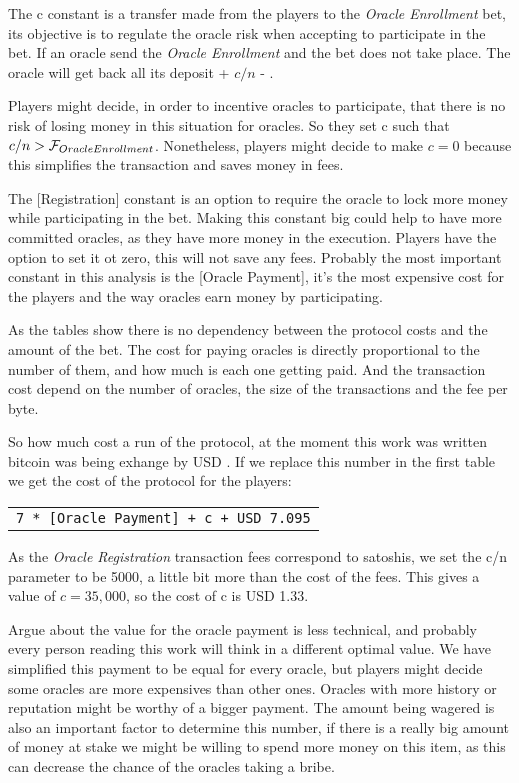 The c constant is a transfer made from the players to the
  \textit{Oracle Enrollment} bet, its objective is to regulate the oracle
  risk when accepting to participate in the bet.
If an oracle send the \textit{Oracle Enrollment} and the bet does not take
  place. The oracle will get back all its deposit + $c/n$ -
  .

Players might decide, in order to incentive oracles to participate, that there
  is no risk of losing money in this situation for oracles. So they set c such
  that $c/n > \mathcal{F}_{OracleEnrollment}$.
Nonetheless, players might decide to make $c = 0$ because this simplifies the
  transaction and saves money in fees.

The [Registration] constant is an option to require the oracle to lock more
  money while participating in the bet.
Making this constant big could help to have more committed oracles, as they
  have more money in the execution.
Players have the option to set it ot zero, this will not save any fees.
Probably the most important constant in this analysis is the [Oracle Payment],
  it's the most expensive cost for the players and the way oracles earn money
  by participating.

As the tables show there is no dependency between the protocol costs and the
  amount of the bet.
The cost for paying oracles is directly proportional to the number of them, and
  how much is each one getting paid.
And the transaction cost depend on the number of oracles, the size of the
  transactions and the fee per byte.

So how much cost a run of the protocol, at the moment this work was written
  bitcoin was being exhange by USD \bitcoinusd{}. If we replace this number
  in the first table we get the cost of the protocol for the players:
\begin{center}
    \begin{tabular}{|c|}
        \texttt{7 * [Oracle Payment] + c + USD 7.095}
    \end{tabular}
\end{center}

As the \textit{Oracle Registration} transaction fees correspond to
  \mbox{} satoshis, we set the c/n parameter to be 5000, a
  little bit more than the cost of the fees.
This gives a value of $c = 35,000$, so the cost of c is USD 1.33.

Argue about the value for the oracle payment is less technical, and probably
  every person reading this work will think in a different optimal value.
We have simplified this payment to be equal for every oracle, but players
  might decide some oracles are more expensives than other ones.
Oracles with more history or reputation might be worthy of a bigger payment.
The amount being wagered is also an important factor to determine this number,
  if there is a really big amount of money at stake we might be willing to
  spend more money on this item, as this can decrease the chance of the oracles
  taking a bribe.

